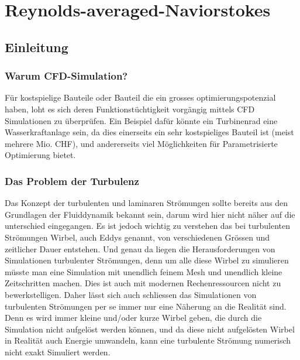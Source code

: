 %
%
%
%
\chapter{Reynolds-averaged-Naviorstokes\label{chapter:reynolds}}
\begin{refsection}

\section{Einleitung}

\subsection{Warum CFD-Simulation?}

Für kostspielige Bauteile oder Bauteil die ein grosses optimierungspotenzial haben,
loht es sich deren Funktionstüchtigkeit vorgängig mittels CFD Simulationen zu überprüfen.
Ein Beispiel dafür könnte ein Turbinenrad eine Wasserkraftanlage sein,
da dies einerseits ein sehr kostspieliges Bauteil ist (meist mehrere Mio. CHF),
und andererseits viel Möglichkeiten für Parametrisierte Optimierung bietet.

\subsection{Das Problem der Turbulenz}

Das Konzept der turbulenten und laminaren Strömungen sollte bereits aus den Grundlagen der Fluiddynamik bekannt sein, darum wird hier nicht näher auf die unterschied eingegangen.
Es ist jedoch wichtig zu verstehen das bei turbulenten Strömungen Wirbel, auch Eddys genannt, von verschiedenen Grössen und zeitlicher Dauer entstehen.
Und genau da liegen die Herausforderungen von Simulationen turbulenter Strömungen,
denn um alle diese Wirbel zu simulieren müsste man eine Simulation mit unendlich feinem Mesh und unendlich kleine Zeitschritten machen.
Dies ist auch mit modernen Rechenressourcen nicht zu bewerkstelligen.
Daher lässt sich auch schliessen das Simulationen von turbulenten Strömungen per se immer nur eine Näherung an die Realität sind.
Denn es wird immer kleine und/oder kurze Wirbel geben, die durch die Simulation nicht aufgelöst werden können,
und da diese nicht aufgelösten Wirbel in Realität auch Energie umwandeln, kann eine turbulente Strömung numerisch nicht exakt Simuliert werden.



\end{refsection}
